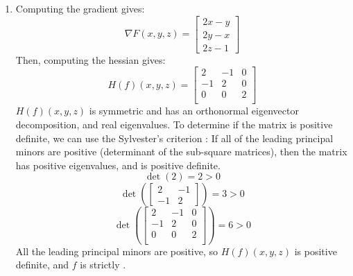 \begin{enumerate}
    \item Computing the gradient gives:
    $$\nabla F(x,y,z) = 
    \begin{bmatrix}
        2x -y \\
        2y -x \\
        2z -1
    \end{bmatrix}$$
    Then, computing the hessian gives:
    $$H(f)(x,y,z) = 
    \begin{bmatrix}
        2 & -1 & 0 \\
        -1 & 2 & 0 \\
        0 & 0 & 2 \\
    \end{bmatrix}$$
    $H(f)(x,y,z)$ is symmetric and has an orthonormal eigenvector decomposition, and real eigenvalues. To determine if the matrix is positive definite, we can use the Sylvester's criterion : If all of the leading principal minors are positive (determinant of the sub-square matrices), then the matrix has positive eigenvalues, and is positive definite.
    $$\det(2) = 2 > 0$$
    $$\det \left (\begin{bmatrix}
        2 & -1 \\
        -1 & 2
    \end{bmatrix} \right) = 3 > 0$$
    $$\det \left (\begin{bmatrix}
        2 & -1 & 0 \\
        -1 & 2 & 0 \\
        0 & 0 & 2 \\
    \end{bmatrix} \right) = 6 > 0$$
    All the leading principal minors are positive, so $H(f)(x,y,z)$ is positive definite, and $f$ is strictly \cvx.
\end{enumerate}
